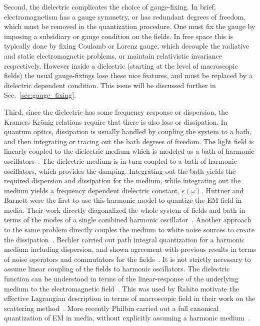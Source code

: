Second, the dielectric complicates the choice of gauge-fixing.  
In brief, electromagnetism has a gauge symmetry, or has redundant degrees of freedom, which must be 
removed in the quantization procedure.  One must fix the gauge by imposing a subsidiary or gauge condition
on the fields.  In free space this is typically done by fixing Coulomb or Lorenz gauge, which 
decouple the radiative and static electromagnetic problems, or maintain relativistic invariance respectively.
However inside a dielectric (starting at the level of macroscopic fields) the usual gauge-fixings lose these nice
features, and must be replaced by a dielectric dependent condition.  
This issue will be discussed further in Sec.~\ref{sec:gauge_fixing}.

Third, since the dielectric has some frequency response or dispersion, the Kramers-Kr\"onig relations 
require that there is also loss or dissipation.  
In  quantum optics, dissipation is usually handled by coupling the system to a bath, and then
integrating or tracing out the bath degrees of freedom.  
The light field is linearly coupled to the dielectric medium which is modeled
as a bath of harmonic oscillators~\cite{Huttner1992,Dung1998,Bechler1999}.
The dielectric medium is in turn coupled to a bath of harmonic oscillators, which provides the damping.
Integrating out the bath yields the required dispersion and dissipation for the medium, 
while integrating out the medium yields a frequency dependent dielectric constant, $\epsilon(\omega)$.
Huttner and Barnett were the first to use this harmonic model to quantize the EM field in media. Their
work directly diagonalized the whole system of fields and bath in terms of the modes of 
a single combined harmonic oscillator~\cite{Huttner1992}.
Another approach to the same problem directly couples the medium to white noise sources to create the dissipation~\cite{Dung1998}.
Bechler carried out path integral quantization for a harmonic medium 
including dispersion, and shown agreement with previous results in terms 
of noise operators and commutators for the fields~\cite{Bechler1999,Bechler2006}.  
It is not strictly necessary to assume linear coupling of the fields to harmonic oscillators. 
The dielectric function can be understood in terms of the linear-response of the underlying 
medium to the electromagnetic field~\cite{Altland2011}.
This was used by Rahi\etal to motivate the effective Lagrangian description in terms of macroscopic field in their 
work on the scattering method~\cite{Rahi2009}.    
More recently Philbin carried out a full canonical quantization of EM in media, without explicitly 
assuming a harmonic medium~\cite{Philbin2010}.

